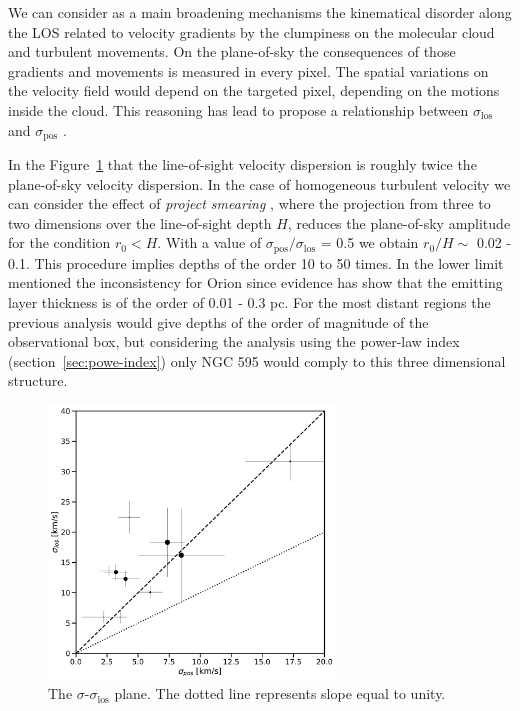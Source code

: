 \documentclass[fleqn,usenatbib, useAMS, a4paper]{mnras}
\newcommand\pos{\ensuremath{_{\mathrm{pos}}}}
\begin{document}
We can consider as a main broadening mechanisms the kinematical disorder along the LOS related to velocity gradients by the clumpiness on the molecular cloud and turbulent movements.
On the plane-of-sky the consequences of those gradients and movements is measured in every pixel. 
The spatial variations on the velocity field would depend on the targeted pixel, depending on the motions inside the cloud.
This reasoning has lead to  propose a relationship between \(\sigma_{\text{los}}\) and \(\sigma\pos\) \citep{2011MNRAS.413..705L}.

In the Figure~\ref{fig:los-vs-pos} that the line-of-sight velocity dispersion is roughly twice the plane-of-sky velocity dispersion.
In the case of homogeneous turbulent velocity we can consider the effect of \textit{project smearing} \citep{1984ApJ...277..556S}, where the projection from three to two dimensions over the line-of-sight depth \(H\), reduces the plane-of-sky amplitude for the condition \(r_{0} < H\).
With a value of \(\sigma\pos / \sigma_{\text{los}}\) = 0.5 we obtain \(r_{0} / H \sim\) 0.02 - 0.1.
This procedure implies depths of the order 10 to 50 times.
In the lower limit \citet{arthur2016turbulence} mentioned the inconsistency for Orion since evidence has show that the emitting layer thickness is of the order of 0.01 - 0.3 pc.
For the most distant regions the previous analysis would give depths of the order of magnitude of the observational box, but considering the analysis using the power-law index (section~\ref{sec:powe-index}) only NGC 595 would comply to this three dimensional structure.



\begin{figure}
\centering 
\includegraphics[width=3in]{Figures/corr-los-vs-pos}
\caption{The $\sigma$-$\sigma_{\text{los}}$ plane. The dotted line represents slope equal to unity.}
\label{fig:los-vs-pos}
\end{figure}
\end{document}
